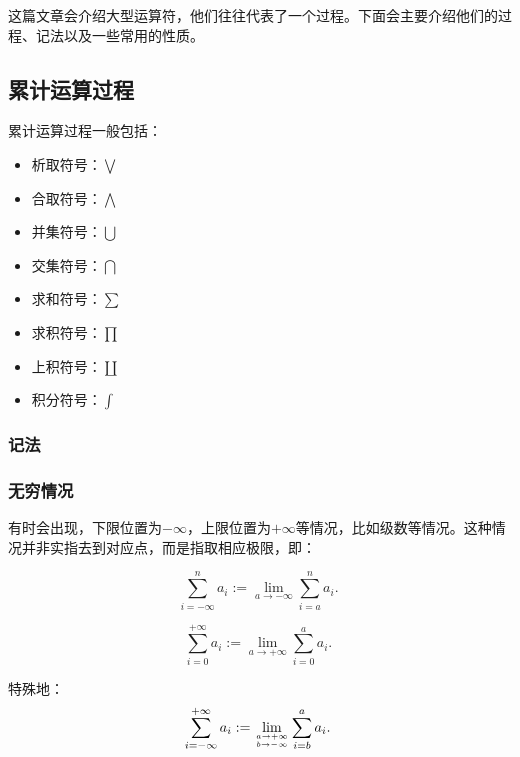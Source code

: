 
\begin{issues}
\issueDraft
\end{issues}

这篇文章会介绍大型运算符，他们往往代表了一个过程。下面会主要介绍他们的过程、记法以及一些常用的性质。

\subsection{累计运算过程}

累计运算过程一般包括：
\begin{itemize}
\item 析取符号：$\bigvee$
\item 合取符号：$\bigwedge$
\item 并集符号：$\bigcup$
\item 交集符号：$\bigcap$
\item 求和符号：$\sum$
\item 求积符号：$\prod$
\item 上积符号：$\coprod$
\item 积分符号：$\int$
\end{itemize}


\subsubsection{记法}

\subsubsection{无穷情况}

有时会出现，下限位置为$-\infty$，上限位置为$+\infty$等情况，比如级数等情况。这种情况并非实指去到对应点，而是指取相应极限，即：

\begin{equation}
\sum_{i=-\infty}^n a_i:= \lim_{a\to-\infty}\sum_{i=a}^n a_i.~
\end{equation}

\begin{equation}
\sum_{i=0}^{+\infty} a_i:= \lim_{a\to+\infty}\sum_{i=0}^a a_i.~
\end{equation}

特殊地：
\begin{equation}
\sum_{i=-\infty}^{+\infty} a_i:= \lim_{a\to+\infty\atop b\to-\infty}\sum_{i=b}^a a_i.~
\end{equation}

